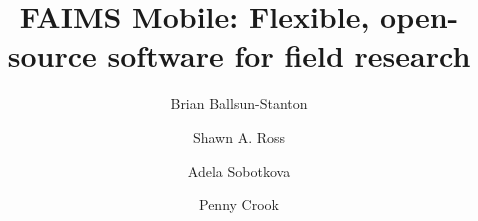 \documentclass[preprint,12pt, a4paper]{elsarticle}
\begin{document}
\begin{frontmatter}



\title{FAIMS Mobile: Flexible, open-source software for field research}


\author[ahis]{Brian Ballsun-Stanton}


\author[mhis]{Shawn A. Ross}

\author[ahis]{Adela Sobotkova}

\author[latrobe]{Penny Crook}

\address[ahis]{Department of Ancient History, Macquarie University, Sydney, Australia}
\address[mhis]{Big History Institute, Department of Modern History, Politics, and International Relations, and Department of Ancient History, Macquarie University, Sydney, Australia}
\address[latrobe]{Department of Archaeology, La Trobe University, Melbourne, Australia}






\end{frontmatter}
\end{document}
